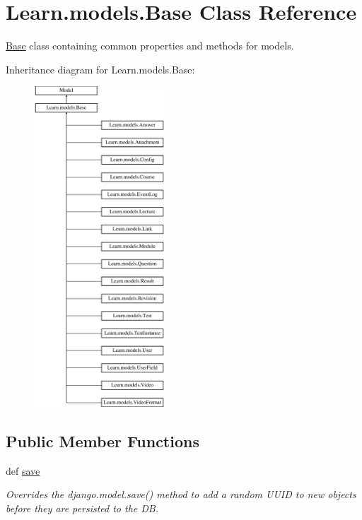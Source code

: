 \hypertarget{class_learn_1_1models_1_1_base}{\section{Learn.\-models.\-Base Class Reference}
\label{class_learn_1_1models_1_1_base}
}


\hyperlink{class_learn_1_1models_1_1_base}{Base} class containing common properties and methods for models.  


Inheritance diagram for Learn.\-models.\-Base\-:\begin{figure}[H]
\begin{center}
\leavevmode
\includegraphics[height=12.000000cm]{class_learn_1_1models_1_1_base}
\end{center}
\end{figure}
\subsection*{Public Member Functions}
\begin{DoxyCompactItemize}
\item 
\hypertarget{class_learn_1_1models_1_1_base_a0674466843add52eb684b61bc487ddb6}{def \hyperlink{class_learn_1_1models_1_1_base_a0674466843add52eb684b61bc487ddb6}{save}}\label{class_learn_1_1models_1_1_base_a0674466843add52eb684b61bc487ddb6}

\begin{DoxyCompactList}\small\item\em Overrides the django.\-model.\-save() method to add a random U\-U\-I\-D to new objects before they are persisted to the D\-B. \end{DoxyCompactList}\end{DoxyCompactItemize}
